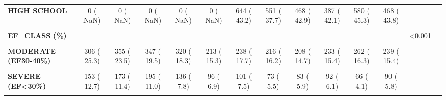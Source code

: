 \documentclass[
]{article}
\begin{document}
\begin{table}[H]
\begin{tabular}[t]{>{\raggedright\arraybackslash}p{5em}ccccccccccccc}
\textbf{HIGH SCHOOL} & 0 (  NaN) & 0 (  NaN) & 0 (  NaN) & 0 (  NaN) & 0 (  NaN) & 644 ( 43.2) & 551 ( 37.7) & 468 ( 42.9) & 387 ( 42.1) & 580 ( 45.3) & 468 ( 43.8) &  & \\
\textbf{\cellcolor{gray!10}{HIGHER EDUCATION / ACADEMIC}} & \cellcolor{gray!10}{0 (  NaN)} & \cellcolor{gray!10}{0 (  NaN)} & \cellcolor{gray!10}{0 (  NaN)} & \cellcolor{gray!10}{0 (  NaN)} & \cellcolor{gray!10}{0 (  NaN)} & \cellcolor{gray!10}{452 ( 30.3)} & \cellcolor{gray!10}{431 ( 29.5)} & \cellcolor{gray!10}{301 ( 27.6)} & \cellcolor{gray!10}{272 ( 29.6)} & \cellcolor{gray!10}{428 ( 33.4)} & \cellcolor{gray!10}{374 ( 35.0)} & \cellcolor{gray!10}{} & \cellcolor{gray!10}{}\\
\textbf{EF\_CLASS (\%)} &  &  &  &  &  &  &  &  &  &  &  & <0.001 & \\
\textbf{\cellcolor{gray!10}{MILD (EF40-50\%)}} & \cellcolor{gray!10}{356 ( 29.4)} & \cellcolor{gray!10}{470 ( 31.1)} & \cellcolor{gray!10}{564 ( 31.7)} & \cellcolor{gray!10}{531 ( 30.3)} & \cellcolor{gray!10}{405 ( 29.2)} & \cellcolor{gray!10}{365 ( 27.2)} & \cellcolor{gray!10}{372 ( 27.9)} & \cellcolor{gray!10}{391 ( 27.7)} & \cellcolor{gray!10}{436 ( 28.8)} & \cellcolor{gray!10}{456 ( 28.4)} & \cellcolor{gray!10}{434 ( 28.1)} & \cellcolor{gray!10}{} & \cellcolor{gray!10}{}\\
\textbf{MODERATE (EF30-40\%)} & 306 ( 25.3) & 355 ( 23.5) & 347 ( 19.5) & 320 ( 18.3) & 213 ( 15.3) & 238 ( 17.7) & 216 ( 16.2) & 208 ( 14.7) & 233 ( 15.4) & 262 ( 16.3) & 239 ( 15.4) &  & \\
\textbf{\cellcolor{gray!10}{NORMAL (EF>50\%)}} & \cellcolor{gray!10}{394 ( 32.6)} & \cellcolor{gray!10}{514 ( 34.0)} & \cellcolor{gray!10}{673 ( 37.8)} & \cellcolor{gray!10}{764 ( 43.6)} & \cellcolor{gray!10}{675 ( 48.6)} & \cellcolor{gray!10}{639 ( 47.6)} & \cellcolor{gray!10}{670 ( 50.3)} & \cellcolor{gray!10}{729 ( 51.7)} & \cellcolor{gray!10}{751 ( 49.7)} & \cellcolor{gray!10}{823 ( 51.2)} & \cellcolor{gray!10}{784 ( 50.7)} & \cellcolor{gray!10}{} & \cellcolor{gray!10}{}\\
\textbf{SEVERE (EF<30\%)} & 153 ( 12.7) & 173 ( 11.4) & 195 ( 11.0) & 136 (  7.8) & 96 (  6.9) & 101 (  7.5) & 73 (  5.5) & 83 (  5.9) & 92 (  6.1) & 66 (  4.1) & 90 (  5.8) &  & \\
\textbf{\cellcolor{gray!10}{EZE\_CHR = YES (\%)}} & \cellcolor{gray!10}{0 (  NaN)} & \cellcolor{gray!10}{0 (  NaN)} & \cellcolor{gray!10}{28 (  1.4)} & \cellcolor{gray!10}{0 (  NaN)} & \cellcolor{gray!10}{19 (  1.1)} & \cellcolor{gray!10}{27 (  1.5)} & \cellcolor{gray!10}{40 (  2.1)} & \cellcolor{gray!10}{43 (  4.3)} & \cellcolor{gray!10}{67 (  9.0)} & \cellcolor{gray!10}{134 (  7.7)} & \cellcolor{gray!10}{161 (  9.2)} & \cellcolor{gray!10}{NaN} & \cellcolor{gray!10}{}\\

\end{tabular}
\end{table}
\end{document}

